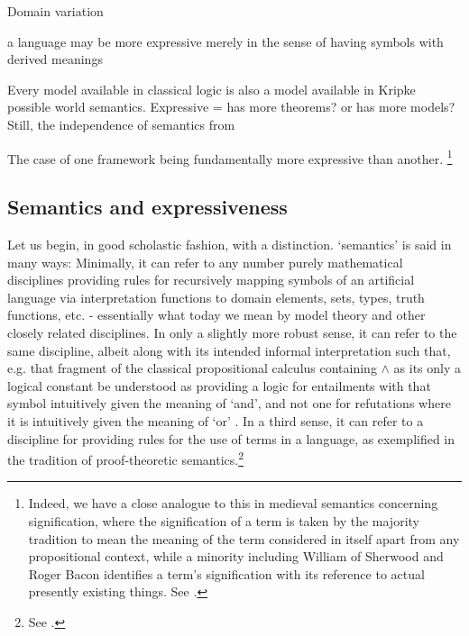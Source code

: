\documentclass[]{article}
\begin{document}
Domain variation

a language may be more expressive merely in the sense of having symbols with derived meanings 

Every model available in classical logic is also a model available in Kripke possible world semantics.
Expressive = has more theorems? or has more models?
Still, the independence of semantics from 


% 


The case of one framework being fundamentally more expressive than another.
\footnote{
	Indeed, we have a close analogue to this in medieval semantics concerning signification, 
	where the signification of a term is taken by the majority tradition to mean the meaning of the term 
	considered in itself apart from any propositional context, 
	while a minority including William of Sherwood and Roger Bacon identifies a term's signification with its reference to actual presently existing things. 
	See \autocite[170-171]{DeRijk1982}. %
} 
\subsection{Semantics and expressiveness}
Let us begin, in good scholastic fashion, with a distinction.
`semantics' is said in many ways: 
Minimally, it can refer to any number purely mathematical disciplines providing rules for recursively mapping symbols of an artificial language via interpretation functions to domain elements, sets, types, truth functions, etc. - essentially what today we mean by model theory and other closely related disciplines. 
In only a slightly more robust sense, 
it can refer to the same discipline, 
albeit along with its intended informal interpretation such that, 
e.g. that fragment of the classical propositional calculus containing $\wedge$ as its only a logical constant be understood as providing a logic for entailments with that symbol intuitively given the meaning of `and', 
and not one for refutations where it is intuitively given the meaning of `or' .
In a third sense, 
it can refer to a discipline for providing rules for the use of terms in a language, as exemplified in the tradition of proof-theoretic semantics.\footnote{See \autocite{Francez2016b,Read2010,Schroeder-Heister2006}.} 
\end{document}
